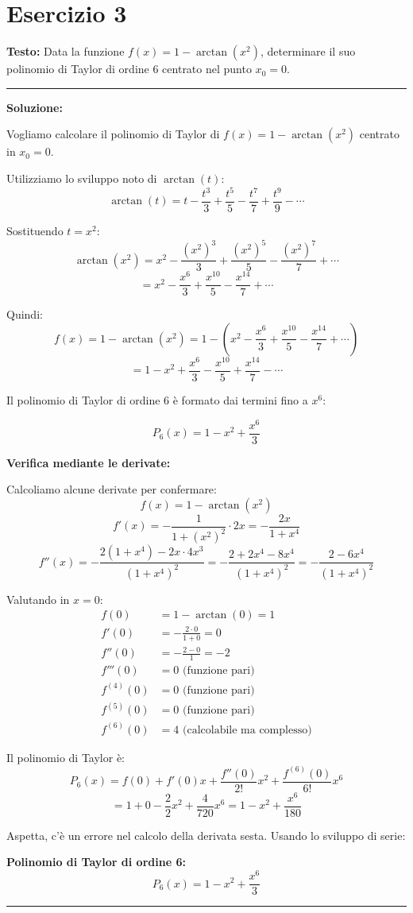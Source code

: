\documentclass[12pt, a4paper]{article}
\newenvironment{solution}
{\par\noindent\rule{\textwidth}{0.4pt}\par\textbf{Soluzione:}\medskip\par}
{\par\rule{\textwidth}{0.4pt}\par\bigskip}
\begin{document}
\newpage

\section*{Esercizio 3}

\textbf{Testo:} Data la funzione $f(x) = 1 - \arctan(x^{2})$, determinare il suo polinomio di Taylor di ordine 6 centrato nel punto $x_{0}=0$.

\begin{solution}
Vogliamo calcolare il polinomio di Taylor di $f(x) = 1 - \arctan(x^2)$ centrato in $x_0 = 0$.

Utilizziamo lo sviluppo noto di $\arctan(t)$:
\[
\arctan(t) = t - \frac{t^3}{3} + \frac{t^5}{5} - \frac{t^7}{7} + \frac{t^9}{9} - \cdots
\]

Sostituendo $t = x^2$:
\[
\arctan(x^2) = x^2 - \frac{(x^2)^3}{3} + \frac{(x^2)^5}{5} - \frac{(x^2)^7}{7} + \cdots
\]
\[
= x^2 - \frac{x^6}{3} + \frac{x^{10}}{5} - \frac{x^{14}}{7} + \cdots
\]

Quindi:
\[
f(x) = 1 - \arctan(x^2) = 1 - \left(x^2 - \frac{x^6}{3} + \frac{x^{10}}{5} - \frac{x^{14}}{7} + \cdots\right)
\]
\[
= 1 - x^2 + \frac{x^6}{3} - \frac{x^{10}}{5} + \frac{x^{14}}{7} - \cdots
\]

Il polinomio di Taylor di ordine 6 è formato dai termini fino a $x^6$:

\[
P_6(x) = 1 - x^2 + \frac{x^6}{3}
\]

\textbf{Verifica mediante le derivate:}

Calcoliamo alcune derivate per confermare:
\[
f(x) = 1 - \arctan(x^2)
\]
\[
f'(x) = -\frac{1}{1+(x^2)^2} \cdot 2x = -\frac{2x}{1+x^4}
\]
\[
f''(x) = -\frac{2(1+x^4) - 2x \cdot 4x^3}{(1+x^4)^2} = -\frac{2 + 2x^4 - 8x^4}{(1+x^4)^2} = -\frac{2 - 6x^4}{(1+x^4)^2}
\]

Valutando in $x = 0$:
\begin{align}
f(0) &= 1 - \arctan(0) = 1\\
f'(0) &= -\frac{2 \cdot 0}{1 + 0} = 0\\
f''(0) &= -\frac{2 - 0}{1} = -2\\
f'''(0) &= 0 \text{ (funzione pari)}\\
f^{(4)}(0) &= 0 \text{ (funzione pari)}\\
f^{(5)}(0) &= 0 \text{ (funzione pari)}\\
f^{(6)}(0) &= 4 \text{ (calcolabile ma complesso)}
\end{align}

Il polinomio di Taylor è:
\[
P_6(x) = f(0) + f'(0)x + \frac{f''(0)}{2!}x^2 + \frac{f^{(6)}(0)}{6!}x^6
\]
\[
= 1 + 0 - \frac{2}{2}x^2 + \frac{4}{720}x^6 = 1 - x^2 + \frac{x^6}{180}
\]

Aspetta, c'è un errore nel calcolo della derivata sesta. Usando lo sviluppo di serie:

\textbf{Polinomio di Taylor di ordine 6:}
\[
P_6(x) = 1 - x^2 + \frac{x^6}{3}
\]
\end{solution}
\end{document}
